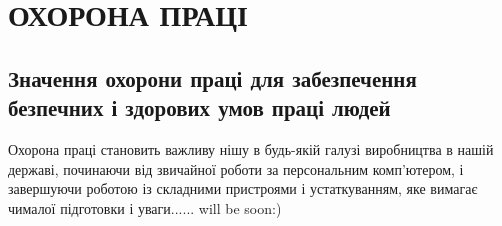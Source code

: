 \section{ОХОРОНА ПРАЦІ}
\subsection{Значення охорони праці для забезпечення безпечних і здорових умов праці людей}

\par Охорона праці становить важливу нішу в будь-якій галузі виробництва в нашій державі, починаючи від звичайної роботи за персональним комп’ютером, і завершуючи роботою із складними пристроями і устаткуванням, яке вимагає чималої підготовки і уваги...... will be soon:)